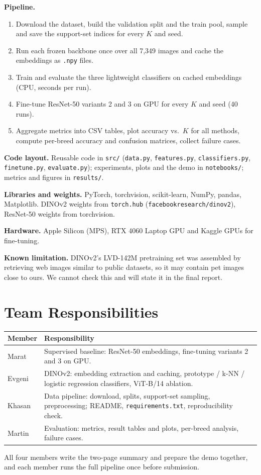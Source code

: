\documentclass[11pt]{article}
\begin{document}
\textbf{Pipeline.}
\begin{enumerate}
    \item Download the dataset, build the validation split and the train pool,
          sample and save the support-set indices for every $K$ and seed.
    \item Run each frozen backbone once over all 7,349 images and cache the
          embeddings as \texttt{.npy} files.
    \item Train and evaluate the three lightweight classifiers on cached embeddings (CPU, seconds per run).
    \item Fine-tune ResNet-50 variants 2 and 3 on GPU for every $K$ and seed (40 runs).
    \item Aggregate metrics into CSV tables, plot accuracy vs.\ $K$ for all methods,
          compute per-breed accuracy and confusion matrices, collect failure cases.
\end{enumerate}

\textbf{Code layout.} Reusable code in \texttt{src/} (\texttt{data.py},
\texttt{features.py}, \texttt{classifiers.py}, \texttt{finetune.py},
\texttt{evaluate.py}); experiments, plots and the demo in \texttt{notebooks/};
metrics and figures in \texttt{results/}.

\textbf{Libraries and weights.} PyTorch, torchvision, scikit-learn, NumPy, pandas,
Matplotlib. DINOv2 weights from \texttt{torch.hub} (\texttt{facebookresearch/dinov2}),
ResNet-50 weights from torchvision.

\textbf{Hardware.} Apple Silicon (MPS), RTX 4060 Laptop GPU and Kaggle GPUs for fine-tuning.

\textbf{Known limitation.} DINOv2's LVD-142M pretraining set was assembled by
retrieving web images similar to public datasets, so it may contain pet images
close to ours. We cannot check this and will state it in the final report.

\section{Team Responsibilities}

\smallskip
\begin{tabular}{@{}lp{}@{}}
\toprule
Member & Responsibility \\
\midrule
Marat & Supervised baseline: ResNet-50 embeddings, fine-tuning variants 2 and 3 on GPU. \\
Evgeni & DINOv2: embedding extraction and caching, prototype / k-NN /
         logistic regression classifiers, ViT-B/14 ablation. \\
Khasan & Data pipeline: download, splits, support-set sampling, preprocessing;
        README, \texttt{requirements.txt}, reproducibility check. \\
Martin & Evaluation: metrics, result tables and plots, per-breed analysis,
         failure cases. \\
\bottomrule
\end{tabular}
\smallskip

All four members write the two-page summary and prepare the demo together, and each
member runs the full pipeline once before submission.
\end{document}
